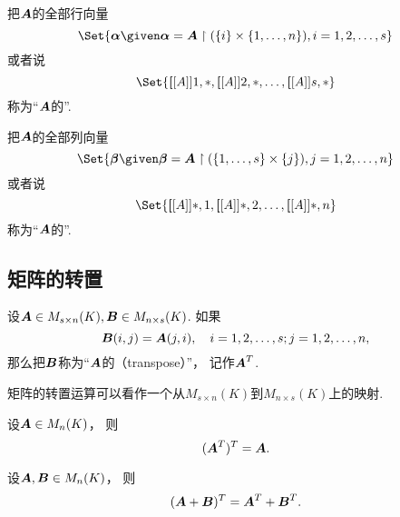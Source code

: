 把\(\boldsymbol{A}\)的全部行向量\begin{equation*}
	\Set{ \vb\alpha \given \vb\alpha=\vb{A}\SetRestrict(\{i\}\times\{1,\dotsc,n\}), i=1,2,\dotsc,s }
\end{equation*}或者说\begin{equation*}
	\Set{\MatrixEntry\vb{A}{1,*},\MatrixEntry\vb{A}{2,*},\dotsc,\MatrixEntry\vb{A}{s,*}}
\end{equation*}
称为“\(\boldsymbol{A}\)的”.

把\(\boldsymbol{A}\)的全部列向量\begin{equation*}
	\Set{ \vb\beta \given \vb\beta=\vb{A}\SetRestrict(\{1,\dotsc,s\}\times\{j\}), j=1,2,\dotsc,n }
\end{equation*}或者说\begin{equation*}
	\Set{\MatrixEntry\vb{A}{*,1},\MatrixEntry\vb{A}{*,2},\dotsc,\MatrixEntry\vb{A}{*,n}}
\end{equation*}
称为“\(\boldsymbol{A}\)的”.

\subsection{矩阵的转置}
\begin{definition}
设\(\boldsymbol{A}\in M_{s \times n}(K),
\boldsymbol{B}\in M_{n \times s}(K)\).
如果\begin{equation*}
	\boldsymbol{B}(i,j)=\boldsymbol{A}(j,i),
	\quad i=1,2,\dotsc,s;j=1,2,\dotsc,n,
\end{equation*}
那么把\(\boldsymbol{B}\)称为“\(\boldsymbol{A}\)的（transpose）”，
记作\(\boldsymbol{A}^T\).
\end{definition}
\begin{remark}
矩阵的转置运算可以看作一个从\(M_{s \times n}(K)\)到\(M_{n \times s}(K)\)上的映射.
\end{remark}

\begin{property}\label{theorem:矩阵的转置.性质1}
设\(\boldsymbol{A} \in M_n(K)\)，
则\begin{equation}
	(\boldsymbol{A}^T)^T = \boldsymbol{A}.
\end{equation}
\end{property}

\begin{property}\label{theorem:矩阵的转置.性质2}
设\(\boldsymbol{A},\boldsymbol{B} \in M_n(K)\)，
则\begin{equation}
	(\boldsymbol{A}+\boldsymbol{B})^T = \boldsymbol{A}^T + \boldsymbol{B}^T.
\end{equation}
\end{property}

